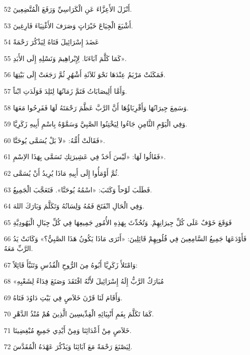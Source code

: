 \par 52 أَنْزَلَ الأَعِزَّاءَ عَنِ الْكَرَاسِيِّ وَرَفَعَ الْمُتَّضِعِينَ.
\par 53 أَشْبَعَ الْجِيَاعَ خَيْرَاتٍ وَصَرَفَ الأَغْنِيَاءَ فَارِغِينَ.
\par 54 عَضَدَ إِسْرَائِيلَ فَتَاهُ لِيَذْكُرَ رَحْمَةً
\par 55 كَمَا كَلَّمَ آبَاءَنَا. لِإِبْراهِيمَ وَنَسْلِهِ إِلَى الأَبَدِ».
\par 56 فَمَكَثَتْ مَرْيَمُ عِنْدَهَا نَحْوَ ثَلاَثَةِ أَشْهُرٍ ثُمَّ رَجَعَتْ إِلَى بَيْتِهَا.
\par 57 وَأَمَّا أَلِيصَابَاتُ فَتَمَّ زَمَانُهَا لِتَلِدَ فَوَلَدَتِ ابْناً.
\par 58 وَسَمِعَ جِيرَانُهَا وَأَقْرِبَاؤُهَا أَنَّ الرَّبَّ عَظَّمَ رَحْمَتَهُ لَهَا فَفَرِحُوا مَعَهَا.
\par 59 وَفِي الْيَوْمِ الثَّامِنِ جَاءُوا لِيَخْتِنُوا الصَّبِيَّ وَسَمَّوْهُ بِاسْمِ أَبِيهِ زَكَرِيَّا.
\par 60 فَقَالَتْ أُمُّهُ: «لاَ بَلْ يُسَمَّى يُوحَنَّا».
\par 61 فَقَالُوا لَهَا: «لَيْسَ أَحَدٌ فِي عَشِيرَتِكِ تَسَمَّى بِهَذَا الاِسْمِ».
\par 62 ثُمَّ أَوْمَأُوا إِلَى أَبِيهِ مَاذَا يُرِيدُ أَنْ يُسَمَّى.
\par 63 فَطَلَبَ لَوْحاً وَكَتَبَ: «اسْمُهُ يُوحَنَّا». فَتَعَجَّبَ الْجَمِيعُ.
\par 64 وَفِي الْحَالِ انْفَتَحَ فَمُهُ وَلِسَانُهُ وَتَكَلَّمَ وَبَارَكَ اللهَ.
\par 65 فَوَقَعَ خَوْفٌ عَلَى كُلِّ جِيرَانِهِمْ. وَتُحُدِّثَ بِهَذِهِ الأُمُورِ جَمِيعِهَا فِي كُلِّ جِبَالِ الْيَهُودِيَّةِ
\par 66 فَأَوْدَعَهَا جَمِيعُ السَّامِعِينَ فِي قُلُوبِهِمْ قَائِلِينَ: «أَتَرَى مَاذَا يَكُونُ هَذَا الصَّبِيُّ؟» وَكَانَتْ يَدُ الرَّبِّ مَعَهُ.
\par 67 وَامْتَلأَ زَكَرِيَّا أَبُوهُ مِنَ الرُّوحِ الْقُدُسِ وَتَنَبَّأَ قَائِلاً:
\par 68 «مُبَارَكٌ الرَّبُّ إِلَهُ إِسْرَائِيلَ لأَنَّهُ افْتَقَدَ وَصَنَعَ فِدَاءً لِشَعْبِهِ
\par 69 وَأَقَامَ لَنَا قَرْنَ خَلاَصٍ فِي بَيْتِ دَاوُدَ فَتَاهُ.
\par 70 كَمَا تَكَلَّمَ بِفَمِ أَنْبِيَائِهِ الْقِدِّيسِينَ الَّذِينَ هُمْ مُنْذُ الدَّهْرِ.
\par 71 خَلاَصٍ مِنْ أَعْدَائِنَا وَمِنْ أَيْدِي جَمِيعِ مُبْغِضِينَا.
\par 72 لِيَصْنَعَ رَحْمَةً مَعَ آبَائِنَا وَيَذْكُرَ عَهْدَهُ الْمُقَدَّسَ.
